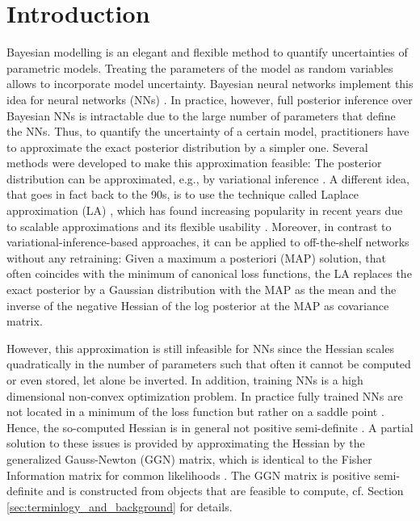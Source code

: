 \section{Introduction}

Bayesian modelling is an elegant and flexible method to quantify uncertainties of parametric models. Treating the parameters of the model as random variables allows to incorporate model uncertainty. Bayesian neural networks implement this idea for neural networks (NNs) \cite{Gal2016,blundell2015weight,kendall2017uncertainties,hernandez2015probabilistic,maddox2019simple}. In practice, however, full posterior inference over Bayesian NNs is intractable due to the large number of parameters that define the NNs. Thus, to quantify the uncertainty of a certain model, practitioners have to approximate the exact posterior distribution by a simpler one.
Several methods were developed to make this approximation feasible:
The posterior distribution can be approximated, e.g., by variational inference \cite{blundell2015weight,kingma2015variational,Gal2016,kendall2017uncertainties,Jordan1999,Wainwright2008}. A different idea, that goes in fact back to the 90s, is to use the technique called Laplace approximation (LA) \cite{MacKay1992}, which has found increasing popularity in recent years due to scalable approximations \cite{lecun1989optimal,Ritter2018} and its flexible usability \cite{LaplaceRedux2021}. Moreover, in contrast to variational-inference-based approaches, it can be applied to off-the-shelf networks without any retraining: Given a maximum a posteriori (MAP) solution, that often coincides with the minimum of canonical loss functions, the LA  replaces the exact posterior by a Gaussian distribution with the MAP as the mean and the inverse of the negative Hessian of the log posterior at the MAP as covariance matrix.

However, this approximation is still infeasible for NNs since the Hessian scales quadratically in the number of parameters such that often it cannot be computed or even stored, let alone be inverted. In addition, training NNs is a high dimensional non-convex optimization problem. In practice fully trained NNs are not located in a minimum of the loss function but rather on a saddle point \cite{Dauphin2014}. Hence, the so-computed Hessian is in general not positive semi-definite \cite{Sagun2016, Papyan2018}.
A partial solution to these issues is provided by approximating the Hessian by the generalized Gauss-Newton (GGN) matrix, which is identical to the Fisher Information matrix for common likelihoods \cite{Schraudolph2002,Pascanu2013,Martens14}. The GGN matrix is positive semi-definite and is constructed from objects that are feasible to compute, cf. Section \ref{sec:terminlogy_and_background} for details. 

